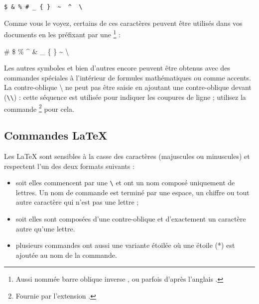 \begin{code}
\verb.$ & % # _ { }  ~  ^  \ . %
 \end{code}

Comme vous le voyez, certains de ces caractères peuvent être utilisés
dans vos documents en les préfixant par une \footnote{Aussi nommée
  \og barre oblique inverse \fg{}, ou parfois  d'après l'anglais
  . \NdT } :

\begin{example}
\# \$ \% \^{} \& \_ \{ \} \~{}
\textbackslash
\end{example}

Les autres symboles et bien d'autres encore peuvent être obtenus avec des
commandes spéciales à l'intérieur de formules mathématiques ou comme
accents. La contre-oblique \textbackslash{} ne peut pas être saisie en ajoutant
une contre-oblique devant (\verb|\\|) : cette séquence est utilisée pour
indiquer les coupures de ligne ; utilisez la commande
\footnote{Fournie par l'extension . \NdT} pour
cela.

\subsection{Commandes \LaTeX{}}

Les  \LaTeX{} sont sensibles à la casse des caractères
(majuscules ou minuscules) et respectent l'un des deux formats
suivants :

\begin{itemize}
\item soit elles commencent par une  \verb|\| et ont un
      nom composé uniquement de lettres. Un nom de commande est
      terminé par une espace, un chiffre ou tout autre caractère qui
      n'est pas une lettre ;
\item soit elles sont composées d'une contre-oblique et d'exactement
  un caractère autre qu'une lettre.
\item plusieurs commandes ont aussi une variante \og étoilée \fg où
  une étoile (*) est ajoutée au nom de la commande.
\end{itemize}

%
%

